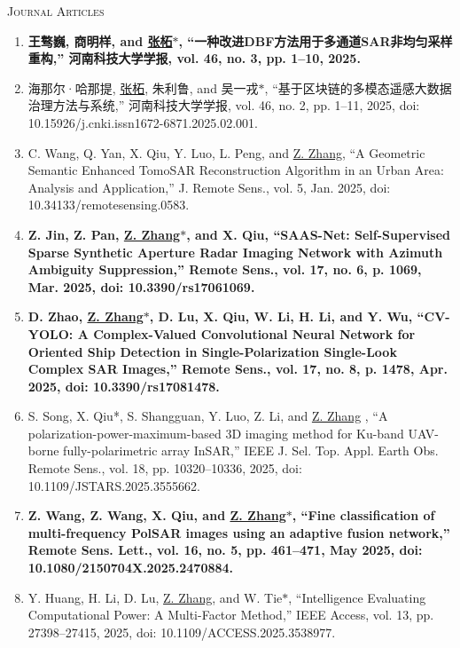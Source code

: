 \documentclass[paper=a4,fontsize=11pt]{scrartcl}
\begin{document}
\textsc{Journal Articles}

\begin{enumerate}

\item \textbf{​王骜巍, 商明样, and \underline{张柘$\ast$}, ``一种改进DBF方法用于多通道SAR非均匀采样重构,'' 河南科技大学学报, vol. 46, no. 3, pp. 1–10, 2025.}

\item ​海那尔·哈那提, \underline{张柘}, 朱利鲁, and 吴一戎$\ast$, ``基于区块链的多模态遥感大数据治理方法与系统,'' 河南科技大学学报, vol. 46, no. 2, pp. 1–11, 2025, doi: 10.15926/j.cnki.issn1672-6871.2025.02.001.

\item C. Wang, Q. Yan, X. Qiu, Y. Luo, L. Peng, and \underline{Z. Zhang}, ``A Geometric Semantic Enhanced TomoSAR Reconstruction Algorithm in an Urban Area: Analysis and Application,'' J. Remote Sens., vol. 5, Jan. 2025, doi: 10.34133/remotesensing.0583.
	
\item \textbf{​Z. Jin, Z. Pan, \underline{Z. Zhang$\ast$}, and X. Qiu, ``SAAS-Net: Self-Supervised Sparse Synthetic Aperture Radar Imaging Network with Azimuth Ambiguity Suppression,'' Remote Sens., vol. 17, no. 6, p. 1069, Mar. 2025, doi: 10.3390/rs17061069.}
	
\item \textbf{​D. Zhao, \underline{Z. Zhang$\ast$}, D. Lu, X. Qiu, W. Li, H. Li, and Y. Wu, ``CV-YOLO: A Complex-Valued Convolutional Neural Network for Oriented Ship Detection in Single-Polarization Single-Look Complex SAR Images,'' Remote Sens., vol. 17, no. 8, p. 1478, Apr. 2025, doi: 10.3390/rs17081478.}
	
\item S. Song, X. Qiu*, S. Shangguan, Y. Luo, Z. Li, and \underline{Z. Zhang} , ``A polarization-power-maximum-based 3D imaging method for Ku-band UAV-borne fully-polarimetric array InSAR,'' IEEE J. Sel. Top. Appl. Earth Obs. Remote Sens., vol. 18, pp. 10320–10336, 2025, doi: 10.1109/JSTARS.2025.3555662.
	
\item \textbf{​Z. Wang, Z. Wang, X. Qiu, and \underline{Z. Zhang$\ast$}, ``Fine classification of multi-frequency PolSAR images using an adaptive fusion network,'' Remote Sens. Lett., vol. 16, no. 5, pp. 461–471, May 2025, doi: 10.1080/2150704X.2025.2470884.}

\item Y. Huang, H. Li, D. Lu, \underline{Z. Zhang}, and W. Tie$\ast$, ``Intelligence Evaluating Computational Power: A Multi-Factor Method,'' IEEE Access, vol. 13, pp. 27398–27415, 2025, doi: 10.1109/ACCESS.2025.3538977.


\end{enumerate}
\end{document}
